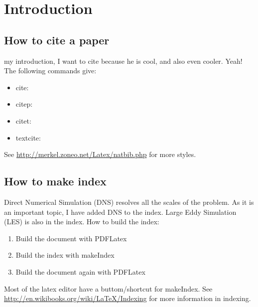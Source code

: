 \chapter{Introduction}
\label{sec: Introduction}

\section{How to cite a paper}
\label{sec: How to cite a paper}

my introduction, I want to cite \citep{Moeng2007} because he is cool, and also \textcite{Pope2000} even cooler. Yeah! The following commands  give:
\begin{itemize}
\item cite: \cite{Moeng2007}
\item citep: \citep{Moeng2007}	
\item citet: \citet{Moeng2007}	
\item textcite: \textcite{Moeng2007}	
\end{itemize}
See \url{http://merkel.zoneo.net/Latex/natbib.php} for more styles.

\section{How to make index}
\label{sec:How to make index}
Direct Numerical Simulation  (DNS) resolves all the scales of the problem. As it is an important topic, I have added DNS to the index. Large Eddy Simulation  (LES) is also in the index. How to build the index:
\begin{enumerate}
	\item Build the document with PDFLatex
	\item Build the index with makeIndex
	\item Build the document again with PDFLatex
\end{enumerate}
Most of the latex editor have a buttom/shortcut for makeIndex. See \url{http://en.wikibooks.org/wiki/LaTeX/Indexing} for more information in indexing.

